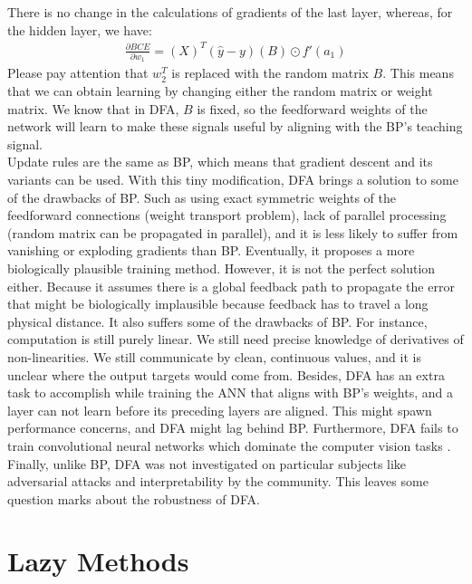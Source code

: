 \documentclass[a4paper, nobind]{templates/ociamthesis}
\begin{document}
There is no change in the calculations of gradients of the last layer, whereas, for the hidden layer, we have:
\[
\begin{aligned}
\frac{\partial BCE}{\partial w_{1}}= \left(X\right)^T\left(\hat{y}-y\right)\left(B\right) \odot f'(a_1)
\end{aligned}
\]
Please pay attention that \(w_2^T\) is replaced with the random matrix \(B\). This means that we can obtain learning by changing either the random matrix or weight matrix. We know that in DFA, \(B\) is fixed, so the feedforward weights of the network will learn to make these signals useful by aligning with the BP's teaching signal.\\
Update rules are the same as BP, which means that gradient descent and its variants can be used. With this tiny modification, DFA brings a solution to some of the drawbacks of BP. Such as using exact symmetric weights of the feedforward connections (weight transport problem), lack of parallel processing (random matrix can be propagated in parallel), and it is less likely to suffer from vanishing or exploding gradients than BP. Eventually, it proposes a more biologically plausible training method. However, it is not the perfect solution either. Because it assumes there is a global feedback path to propagate the error that might be biologically implausible because feedback has to travel a long physical distance. It also suffers some of the drawbacks of BP. For instance, computation is still purely linear. We still need precise knowledge of derivatives of non-linearities. We still communicate by clean, continuous values, and it is unclear where the output targets would come from. Besides, DFA has an extra task to accomplish while training the ANN that aligns with BP's weights, and a layer can not learn before its preceding layers are aligned. This might spawn performance concerns, and DFA might lag behind BP.
Furthermore, DFA fails to train convolutional neural networks which dominate the computer vision tasks \cite{refinetti2021align, launay2019principled}. Finally, unlike BP, DFA was not investigated on particular subjects like adversarial attacks and interpretability by the community. This leaves some question marks about the robustness of DFA.

\hypertarget{lazy-methods}{%
\section{Lazy Methods}\label{lazy-methods}}
\end{document}
